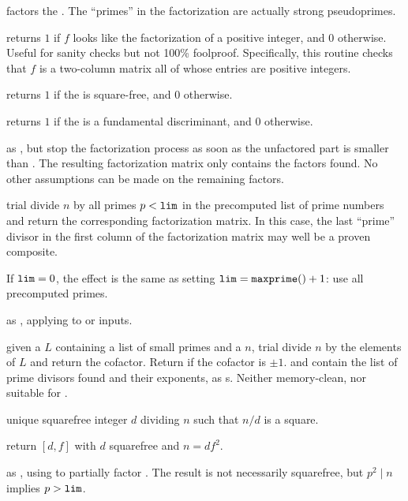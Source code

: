 
 factors the  . The ``primes''
in the factorization are actually strong pseudoprimes.

 returns $1$ if $f$ looks like the factorization
of a positive integer, and $0$ otherwise. Useful for sanity checks but not
100\% foolproof. Specifically, this routine checks that $f$ is a two-column
matrix all of whose entries are positive integers.

 returns $1$ if the  
is square-free, and $0$ otherwise.

 returns $1$ if the  
is a fundamental discriminant, and $0$ otherwise.

 as , but stop the
factorization process as soon as the unfactored part is smaller than .
The resulting factorization matrix only contains the factors found. No other
assumptions can be made on the remaining factors.

 trial divide $n$ by all primes $p
< {\tt lim}$ in the precomputed list of prime numbers and return the
corresponding factorization matrix. In this case, the last ``prime'' divisor
in the first column of the factorization matrix may well be a proven
composite.

If ${\tt lim} = 0$, the effect is the same as setting ${\tt lim} =
{\tt maxprime()} + 1$: use all precomputed primes.

 as , applying to
 or  inputs.

 given a 
$L$ containing a list of small primes and a  $n$, trial divide
$n$ by the elements of $L$ and return the cofactor. Return  if the
cofactor is $\pm 1$.  and  contain the list of prime divisors
found and their exponents, as s. Neither memory-clean, nor
suitable for .

 unique squarefree integer $d$ dividing $n$ such that
$n/d$ is a square.

 return $[d,f]$ with $d$ squarefree and $n = df^2$.

 as , using
 to partially factor . The result is not
necessarily squarefree, but $p^2 \mid n$ implies $p > {\tt lim}$.

